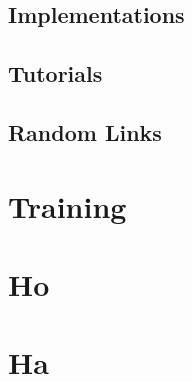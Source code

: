 \documentclass{report}
\begin{document}
    \section{Implementations}
    \section{Tutorials}
    \section{Random Links}
\chapter{Training}
\begin{appendices}
  \chapter{Ho}
  \chapter{Ha}
\end{appendices}
\end{document}
